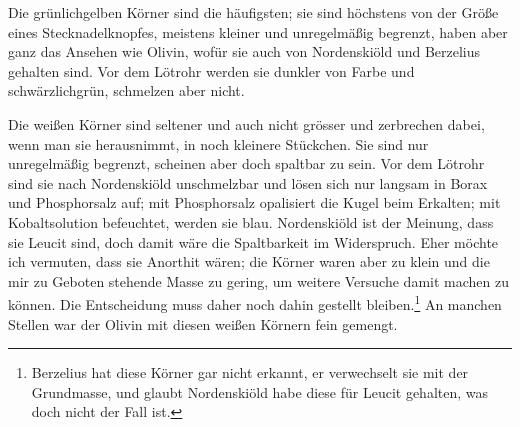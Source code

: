 \documentclass[a4paper, 11pt, oneside]{article}
\begin{document}
Die grünlichgelben Körner sind die häufigsten; sie sind höchstens von der Größe eines Stecknadelknopfes, meistens kleiner und unregelmäßig begrenzt, haben aber ganz das Ansehen wie Olivin, wofür sie auch von Nordenskiöld und Berzelius gehalten sind. Vor dem Lötrohr werden sie dunkler von Farbe und schwärzlichgrün, schmelzen aber nicht.

Die weißen Körner sind seltener und auch nicht grösser und zerbrechen dabei, wenn man sie herausnimmt, in noch kleinere Stückchen. Sie sind nur unregelmäßig begrenzt, scheinen aber doch spaltbar zu sein. Vor dem Lötrohr sind sie nach Nordenskiöld unschmelzbar und lösen sich nur langsam in Borax und Phosphorsalz auf; mit Phosphorsalz opalisiert die Kugel beim Erkalten; mit Kobaltsolution befeuchtet, werden sie blau. Nordenskiöld ist der Meinung, dass sie Leucit sind, doch damit wäre die Spaltbarkeit im Widerspruch. Eher möchte ich vermuten, dass sie Anorthit wären; die Körner waren aber zu klein und die mir zu Geboten stehende Masse zu gering, um weitere Versuche damit machen zu können. Die Entscheidung muss daher noch dahin gestellt bleiben.\footnote{Berzelius hat diese Körner gar nicht erkannt, er verwechselt sie mit der Grundmasse, und glaubt Nordenskiöld habe diese für Leucit gehalten, was doch nicht der Fall ist.} An manchen Stellen war der Olivin mit diesen weißen Körnern fein gemengt.
\end{document}
